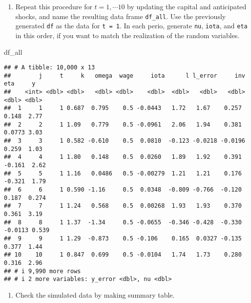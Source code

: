 \documentclass[
]{book}
\newenvironment{Shaded}{\begin{snugshade}}{\end{snugshade}}
\newcommand{\NormalTok}[1]{#1}
\providecommand{\tightlist}{%
  \setlength{\itemsep}{0pt}\setlength{\parskip}{0pt}}
\begin{document}
\begin{enumerate}
\def\labelenumi{\arabic{enumi}.}
\setcounter{enumi}{8}
\tightlist
\item
  Repeat this procedure for \(t = 1, \cdots 10\) by updating the capital and anticipated shocks, and name the resulting data frame \texttt{df\_all}. Use the previously generated \texttt{df} as the data for \texttt{t\ =\ 1}. In each perio, generate \texttt{nu}, \texttt{iota}, and \texttt{eta} in this order, if you want to match the realization of the random variables.
\end{enumerate}

\begin{Shaded}
\begin{Highlighting}[]
\NormalTok{df\_all}
\end{Highlighting}
\end{Shaded}

\begin{verbatim}
## # A tibble: 10,000 x 13
##        j     t     k   omega  wage     iota      l l_error     inv     eta     y
##    <int> <dbl> <dbl>   <dbl> <dbl>    <dbl>  <dbl>   <dbl>   <dbl>   <dbl> <dbl>
##  1     1     1 0.687  0.795    0.5 -0.0443   1.72   1.67    0.257   0.148  2.77 
##  2     2     1 1.09   0.779    0.5 -0.0961   2.06   1.94    0.381   0.0773 3.03 
##  3     3     1 0.582 -0.610    0.5  0.0810  -0.123 -0.0218 -0.0196  0.259  1.03 
##  4     4     1 1.80   0.148    0.5  0.0260   1.89   1.92    0.391  -0.161  2.62 
##  5     5     1 1.16   0.0486   0.5 -0.00279  1.21   1.21    0.176  -0.321  1.79 
##  6     6     1 0.590 -1.16     0.5  0.0348  -0.809 -0.766  -0.120   0.187  0.274
##  7     7     1 1.24   0.568    0.5  0.00268  1.93   1.93    0.370   0.361  3.19 
##  8     8     1 1.37  -1.34     0.5 -0.0655  -0.346 -0.428  -0.330  -0.0113 0.539
##  9     9     1 1.29  -0.873    0.5 -0.106    0.165  0.0327 -0.135   0.377  1.44 
## 10    10     1 0.847  0.699    0.5 -0.0104   1.74   1.73    0.280   0.316  2.96 
## # i 9,990 more rows
## # i 2 more variables: y_error <dbl>, nu <dbl>
\end{verbatim}

\begin{enumerate}
\def\labelenumi{\arabic{enumi}.}
\setcounter{enumi}{9}
\tightlist
\item
  Check the simulated data by making summary table.
\end{enumerate}
\end{document}
